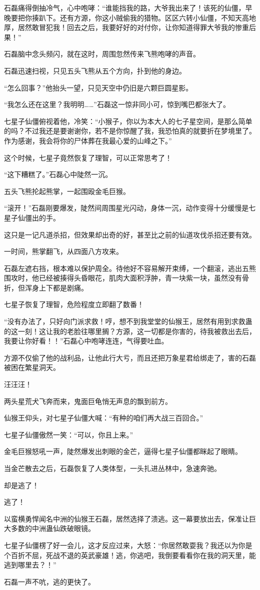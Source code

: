 \begin{this_body}
石磊痛得倒抽冷气，心中咆哮：“谁能挡我的路，大爷我出来了！该死的仙僵，早晚要把你揍趴下。还有方源，你这小贼偷我的猎物。区区六转小仙僵，不知天高地厚，居然敢冒犯我！回去之后，我要好好的对付你，让你知道得罪大爷我的惨重后果！”

石磊脑中念头频闪，就在这时，周围忽然传来飞熊咆哮的声音。

石磊迅速扫视，只见五头飞熊从五个方向，扑到他的身边。

“怎么回事？”他抬头一望，只见天空中仍旧是六颗巨圆星影。

“我怎么还在这里？我明明……”石磊这一惊非同小可，惊到嘴巴都张大了。

七星子仙僵俯视着他，冷笑：“小猴子，你以为本大人的七子星空间，是那么简单的吗？不过我还是要谢谢你，若不是你惊醒了我，我恐怕真的就要折在梦境里了。作为感谢，我会将你的尸体葬在我最心爱的山峰之下。”

这个时候，七星子竟然恢复了理智，可以正常思考了！

“这下糟糕了。”石磊心中陡然一沉。

五头飞熊抡起熊掌，一起围殴金毛巨猴。

“滚开！”石磊刚要爆发，陡然间周围星光闪动，身体一沉，动作变得十分缓慢是七星子仙僵出的手。

这只是一记凡道杀招，但效果却出奇的好，甚至比之前的仙道攻伐杀招还要有效。

一时间，熊掌翻飞，从四面八方攻来。

石磊左遮右挡，根本难以保护周全。待他好不容易解开束缚，一个翻滚，逃出五熊围攻时，他已经被揍得头昏眼花，肌肉大面积浮肿，青一块紫一块，虽然没有骨折，但浑身上下都是剧痛。

七星子恢复了理智，危险程度立即翻了数番！

“没有办法了，只好向门派求救！哼，想不到我堂堂的仙猴王，居然有用到求救蛊的这一刻！这让我的老脸往哪里搁？方源，这一切都是你害的，待我被救出去后，我要让你好看！！”石磊心中咆哮连连，气得要吐血。

方源不仅偷了他的战利品，让他此行大亏，而且还把万象星君给绑走了，害的石磊被困在繁星洞天。

汪汪汪！

两头星荒犬飞奔而来，鬼面巨龟悄无声息的飘到前方。

仙猴王仰头，对七星子仙僵大喊：“有种的咱们再大战三百回合。”

七星子仙僵傲然一笑：“可以，你且上来。”

金毛巨猴怒吼一声，陡然爆发出刺眼的金芒，逼得七星子仙僵都眯起了眼睛。

当金芒散去之后，石磊恢复了人类体型，一头扎进丛林中，急速奔驰。

却是逃了！

逃了！

以蛮横勇悍闻名中洲的仙猴王石磊，居然选择了溃逃。这一幕要放出去，保准让巨大多数的中洲蛊仙跌破眼镜。

七星子仙僵楞了好一会儿，这才反应过来，大怒：“你居然敢耍我？我还以为你是个百折不屈，死战不退的英武豪雄！逃，你逃吧，我倒要看看你在我的洞天里，能逃到哪里去？！”

石磊一声不吭，逃的更快了。

\end{this_body}

